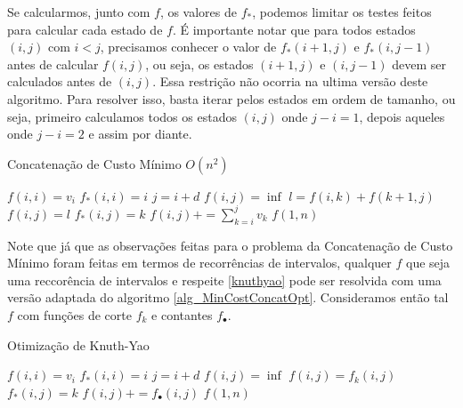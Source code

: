 Se calcularmos, junto com $f$, os valores de $f_*$, podemos limitar os testes feitos para calcular cada estado de $f$. É importante notar que para todos estados $(i,j)$ com $i < j$, precisamos conhecer o valor de $f_*(i+1, j)$ e $f_*(i,j-1)$ antes de calcular $f(i,j)$, ou seja, os estados $(i+1,j)$ e $(i,j-1)$ devem ser calculados antes de $(i,j)$. Essa restrição não ocorria na ultima versão deste algoritmo. Para resolver isso, basta iterar pelos estados em ordem de tamanho, ou seja, primeiro calculamos todos os estados $(i,j)$ onde $j-i = 1$, depois aqueles onde $j-i = 2$ e assim por diante.

\begin{algorithm}[H]
\caption{Concatenação de Custo Mínimo $O(n^2)$}
\label{alg_MinCostConcatOpt}
\begin{algorithmic}[1]
        \State $f(i,i) = v_i$
        \State $f_*(i,i) = i$
    \EndFor
            \State $j = i+d$
            \State $f(i,j) = \inf$
                \State $l = f(i,k) + f(k+1,j)$
                    \State $f(i,j) = l$
                    \State $f_*(i,j) = k$
                \EndIf
            \EndFor
            \State $f(i,j) += \sum\limits_{k=i}^j v_k$
        \EndFor
    \EndFor
    \State \Return $f(1,n)$
\EndFunction
\end{algorithmic}
\end{algorithm}

Note que já que as observações feitas para o problema da Concatenação de Custo Mínimo foram feitas em termos de recorrências de intervalos, qualquer $f$ que seja uma reccorência de intervalos e respeite \ref{knuthyao} pode ser resolvida com uma versão adaptada do algoritmo \ref{alg_MinCostConcatOpt}. Consideramos então tal $f$ com funções de corte $f_k$ e contantes $f_\bullet$.

\begin{algorithm}[H]
\caption{Otimização de Knuth-Yao}
\label{alg_KnuthYao}
\begin{algorithmic}[1]
        \State $f(i,i) = v_i$
        \State $f_*(i,i) = i$
    \EndFor
            \State $j = i+d$
            \State $f(i,j) = \inf$
                 \label{alg_KnuthYao:fk}
                    \State $f(i,j) = f_k(i,j)$ \label{alg_KnuthYao:fk2}
                    \State $f_*(i,j) = k$
                \EndIf
            \EndFor
            \State $f(i,j) += f_\bullet(i,j)$ \label{alg_KnuthYao:fbullet}
        \EndFor
    \EndFor
    \State \Return $f(1,n)$
\EndFunction
\end{algorithmic}
\end{algorithm}

